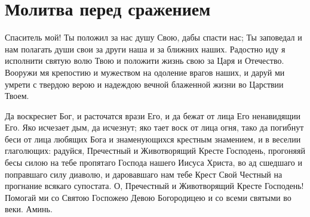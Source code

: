 \section{Молитва перед сражением}\begin{mymulticols}
 

Спаситель мой! Ты положил за нас душу Свою, дабы спасти нас; Ты заповедал и нам полагать души свои за други наша и за ближних наших. Радостно иду я исполнити святую волю Твою и положити жизнь свою за Царя и Отечество. Вооружи мя крепостию и мужеством на одоление врагов наших, и даруй ми умрети с твердою верою и надеждою вечной блаженной жизни во Царствии Твоем.


Да воскреснет Бог, и расточатся врази Его, и да бежат от лица Его ненавидящии Его. Яко исчезает дым, да исчезнут; яко тает воск от лица огня, тако да погибнут беси от лица любящих Бога и знаменующихся крестным знамением, и в веселии глаголющих: радуйся, Пречестный и Животворящий Кресте Господень, прогоняяй бесы силою на тебе пропятаго Господа нашего Иисуса Христа, во ад сшедшаго и поправшаго силу диаволю, и даровавшаго нам тебе Крест Свой Честный на прогнание всякаго супостата. О, Пречестный и Животворящий Кресте Господень! Помогай ми со Святою Госпожею Девою Богородицею и со всеми святыми во веки. Аминь.

\end{mymulticols}

\mychapterending


